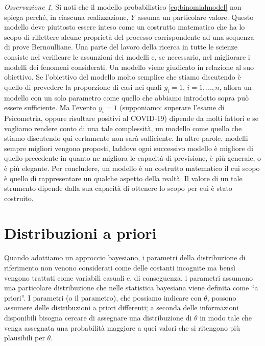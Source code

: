 \documentclass[
  11pt,
]{krantz}
\theoremstyle{definition}
\theoremstyle{definition}
\theoremstyle{definition}
\theoremstyle{definition}
\theoremstyle{remark}
\newtheorem*{remark}{Osservazione}
\begin{document}
\begin{remark}
Si noti che il modello probabilistico \eqref{eq:binomialmodel} non spiega perché, in ciascuna realizzazione, \(Y\) assuma un particolare valore. Questo modello deve piuttosto essere inteso come un costrutto matematico che ha lo scopo di riflettere alcune proprietà del processo corrispondente ad una sequenza di prove Bernoulliane. Una parte del lavoro della ricerca in tutte le scienze consiste nel verificare le assunzioni dei modelli e, se necessario, nel migliorare i modelli dei fenomeni considerati. Un modello viene giudicato in relazione al suo obiettivo. Se l'obiettivo del modello molto semplice che stiamo discutendo è quello di prevedere la proporzione di casi nei quali \(y_i = 1\), \(i = 1, \dots, n\), allora un modello con un solo parametro come quello che abbiamo introdotto sopra può essere sufficiente. Ma l'evento \(y_i=1\) (supponiamo: superare l'esame di Psicometria, oppure risultare positivi al COVID-19) dipende da molti fattori e se vogliamo rendere conto di una tale complessità, un modello come quello che stiamo discutendo qui certamente non sarà sufficiente. In altre parole, modelli sempre migliori vengono proposti, laddove ogni successivo modello è migliore di quello precedente in quanto ne migliora le capacità di previsione, è più generale, o è più elegante. Per concludere, un modello è un costrutto matematico il cui scopo è quello di rappresentare un qualche aspetto della realtà. Il valore di un tale strumento dipende dalla sua capacità di ottenere lo scopo per cui è stato costruito.
\end{remark}

\hypertarget{distribuzioni-a-priori}{%
\section{Distribuzioni a priori}\label{distribuzioni-a-priori}}

Quando adottiamo un approccio bayesiano, i parametri della distribuzione di riferimento non venono considerati come delle costanti incognite ma bensì vengono trattati come variabili casuali e, di conseguenza, i parametri assumono una particolare distribuzione che nelle statistica bayesiana viene definita come ``a priori''. I parametri (o il parametro), che possiamo indicare con \(\theta\), possono assumere delle distribuzioni a priori differenti; a seconda delle informazioni disponibili bisogna cercare di assegnare una distribuzione di \(\theta\) in modo tale che venga assegnata una probabilità maggiore a quei valori che si ritengono più plausibili per \(\theta\).
\end{document}
